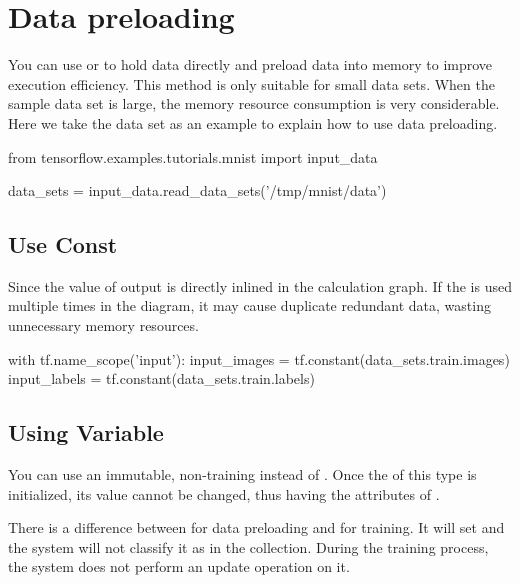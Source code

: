 \section{Data preloading}
\begin{content}
You can use  or  to hold data directly and preload data into memory to improve execution efficiency. This method is only suitable for small data sets. When the sample data set is large, the memory resource consumption is very considerable. Here we take the  data set as an example to explain how to use data preloading.

\begin{leftbar}
\begin{python}
from tensorflow.examples.tutorials.mnist import input_data

data_sets = input_data.read_data_sets('/tmp/mnist/data')
\end{python}
\end{leftbar}


\subsection{Use Const}
Since the value of  output  is directly inlined in the calculation graph. If the  is used multiple times in the diagram, it may cause duplicate redundant data, wasting unnecessary memory resources.

\begin{leftbar}
\begin{python}
with tf.name_scope('input'):
  input_images = tf.constant(data_sets.train.images)
  input_labels = tf.constant(data_sets.train.labels)
\end{python}
\end{leftbar}


\subsection{Using Variable}
You can use an immutable, non-training  instead of . Once the  of this type is initialized, its value cannot be changed, thus having the attributes of .

There is a difference between  for data preloading and  for training. It will set  and the system will not classify it as  in the collection. During the training process, the system does not perform an update operation on it.


\end{content}
